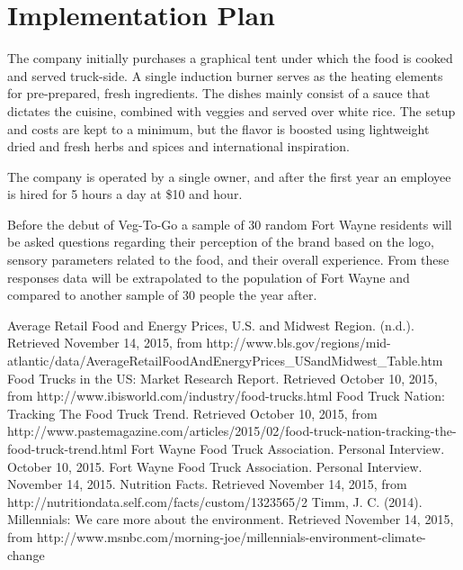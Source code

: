 \documentclass[12pt, letterpaper]{article}
\newcommand{\companyname}{Veg-To-Go}
\begin{document}
\section{Implementation Plan}
The company initially purchases a graphical tent under which the food is cooked and served truck-side.  A single induction burner serves as the heating elements for pre-prepared, fresh ingredients.  The dishes mainly consist of a sauce that dictates the cuisine, combined with veggies and served over white rice.  The setup and costs are kept to a minimum, but the flavor is boosted using lightweight dried and fresh herbs and spices and international inspiration.

The company is operated by a single owner, and after the first year an employee is hired for 5 hours a day at \$10 and hour.

Before the debut of \companyname{} a sample of 30 random Fort Wayne residents will be asked questions regarding their perception of the brand based on the logo, sensory parameters related to the food, and their overall experience.  From these responses data will be extrapolated to the population of Fort Wayne and compared to another sample of 30 people the year after.

\newpage

\begin{thebibliography}{9}

		Average Retail Food and Energy Prices, U.S. and Midwest Region. (n.d.). Retrieved November 14, 2015, from http://www.bls.gov/regions/mid-atlantic/data/AverageRetailFoodAndEnergyPrices\_USandMidwest\_Table.htm
        Food Trucks in the US: Market Research Report. Retrieved October 10, 2015, from http://www.ibisworld.com/industry/food-trucks.html
        Food Truck Nation: Tracking The Food Truck Trend. Retrieved October 10, 2015, from http://www.pastemagazine.com/articles/2015/02/food-truck-nation-tracking-the-food-truck-trend.html
        Fort Wayne Food Truck Association. Personal Interview. October 10, 2015.
	    Fort Wayne Food Truck Association. Personal Interview. November 14, 2015.
	    Nutrition Facts. Retrieved November 14, 2015, from http://nutritiondata.self.com/facts/custom/1323565/2
		Timm, J. C. (2014). Millennials: We care more about the environment. Retrieved November 14, 2015, from http://www.msnbc.com/morning-joe/millennials-environment-climate-change

\end{thebibliography}

\newpage

\end{document}
